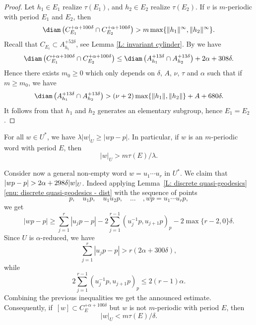 \begin{proof}
Let $h_1\in E_1$ realize $\tau(E_1)$, and $h_2\in E_2$ realize $\tau(E_2)$.
If $v$ is $m$-periodic with period $E_1$ and $E_2$, then\vspace*{-3pt}\enlargethispage{\baselineskip}%
\[
\diam \left( C_{E_1}^{+ \alpha + 100\delta} \cap C_{E_2}^{+\alpha + 100\delta}\right)
> m \max \{\| h_1 \|^\infty,\| h_2 \|^\infty\}.
\]
Recall that $C_{E_i}\subset A_{h_i}^{+52\delta}$, see Lemma \ref{L: invariant cylinder}.
By \cite[Lem.\,2.13]{coulon_geometry_2014} we have\vspace*{-3pt}
\begin{equation*}
\diam \left( C_{E_1}^{+ \alpha + 100\delta} \cap C_{E_2}^{+\alpha + 100\delta}\right)
\leq \diam \left(A_{h_1}^{+13\delta} \cap A_{h_2}^{+13\delta} \right) + 2\alpha + 308\delta.
\end{equation*}
Hence there exists $m_0 \geq 0$ which only depends on $\delta$, $A$, $\nu$, $\tau$ and $\alpha$ such that if $m \geq m_0$, we have\vspace*{-3pt}
\begin{equation*}
\diam \left(A_{h_1}^{+13\delta} \cap A_{h_2}^{+13\delta} \right)
> (\nu +2)\max\{\| h_1 \|,\| h_2 \|\} +A + 680\delta.
\end{equation*}
It follows from \cite[Prop.\,3.44]{coulon_partial_2016} that $h_1$ and $h_2$ generates an elementary subgroup, hence $E_1 = E_2$.
\end{proof}

\begin{rem}
\label{R: growth 1}
For all $w\in U^*$, we have $\lambda |w|_U \geqslant |wp-p|.$
In particular, if $w$ is an $m$-periodic word with period $E$, then\vspace*{-3pt}
\[
|w|_U > m \tau(E)/\lambda.
\]

Consider now a general non-empty word $w = u_1\cdots u_r$ in $U^*$.
We claim that $|wp-\nobreak p|> 2 \alpha + 298\delta|w|_U$.
Indeed applying Lemma~\ref{L: discrete quasi-geodesics}\eqref{enu: discrete quasi-geodesics - dist} with the sequence of points
\begin{equation*}
p, \quad u_1p, \quad u_1u_2p, \quad\dots\quad, wp = u_1\cdots u_rp,
\end{equation*}
we get\vspace*{-3pt}
\begin{equation*}
|wp -p| \geq \sum_{j = 1}^r |u_jp - p| - 2 \sum_{j = 1}^{r-1} (u_j^{-1}p,u_{j+1}p)_p - 2\max\{r-2,0\}\delta.
\end{equation*}
Since $U$ is $\alpha$-reduced, we have\vspace*{-3pt}
\begin{equation*}
\sum_{j = 1}^r |u_jp - p| > r(2\alpha + 300\delta),
\end{equation*}
while\vspace*{-3pt}
\begin{equation*}
2 \sum_{j = 1}^{r-1} (u_j^{-1}p,u_{j+1}p)_p \leq 2(r-1)\alpha.
\end{equation*}
Combining the previous inequalities we get the announced estimate.
Consequently, if~$[w] \subset C_E^{+\alpha + 100\delta}$ but $w$ is not $m$-periodic with period $E$, then
\[
|w|_U < m \tau(E)/\delta.
\]
\end{rem}

